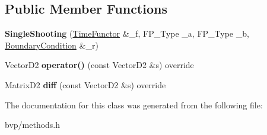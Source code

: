 \subsection*{Public Member Functions}
\begin{DoxyCompactItemize}
\item 
\mbox{\label{classSingleShooting_a08e9ac47e60104458fbec222db4121e4}} 
{\bfseries Single\+Shooting} (\hyperlink{classTimeFunctor}{Time\+Functor} \&\+\_\+f, F\+P\+\_\+\+Type \+\_\+a, F\+P\+\_\+\+Type \+\_\+b, \hyperlink{classBoundaryCondition}{Boundary\+Condition} \&\+\_\+r)
\item 
\mbox{\label{classSingleShooting_af9f88c514e291ca61b90e5c974ecc01a}} 
Vector\+D2 {\bfseries operator()} (const Vector\+D2 \&s) override
\item 
\mbox{\label{classSingleShooting_ac170da093474700b4efc66268b5ace96}} 
Matrix\+D2 {\bfseries diff} (const Vector\+D2 \&s) override
\end{DoxyCompactItemize}


The documentation for this class was generated from the following file\+:\begin{DoxyCompactItemize}
\item 
bvp/methods.\+h\end{DoxyCompactItemize}
